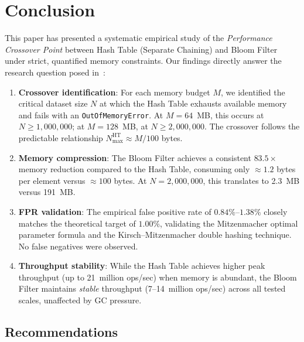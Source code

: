 \section{Conclusion}
\label{sec:conclusion}

This paper has presented a systematic empirical study of the \emph{Performance Crossover Point} between Hash Table (Separate Chaining) and Bloom Filter under strict, quantified memory constraints. Our findings directly answer the research question posed in~:

\begin{enumerate}[label=\textbf{(\arabic*)}]
    \item \textbf{Crossover identification}: For each memory budget $M$, we identified the critical dataset size $N$ at which the Hash Table exhausts available memory and fails with an \texttt{OutOfMemoryError}. At $M = 64$~MB, this occurs at $N \geq 1{,}000{,}000$; at $M = 128$~MB, at $N \geq 2{,}000{,}000$. The crossover follows the predictable relationship $N_{\max}^{\text{HT}} \approx M / 100$ bytes.

    \item \textbf{Memory compression}: The Bloom Filter achieves a consistent $\mathbf{83.5\times}$ memory reduction compared to the Hash Table, consuming only ${\approx}1.2$ bytes per element versus ${\approx}100$ bytes. At $N = 2{,}000{,}000$, this translates to 2.3~MB versus 191~MB.

    \item \textbf{FPR validation}: The empirical false positive rate of $0.84\%$--$1.38\%$ closely matches the theoretical target of $1.00\%$, validating the Mitzenmacher optimal parameter formula and the Kirsch--Mitzenmacher double hashing technique. No false negatives were observed.

    \item \textbf{Throughput stability}: While the Hash Table achieves higher peak throughput (up to 21~million ops/sec) when memory is abundant, the Bloom Filter maintains \emph{stable} throughput (7--14~million ops/sec) across all tested scales, unaffected by GC pressure.
\end{enumerate}

\subsection{Recommendations}

